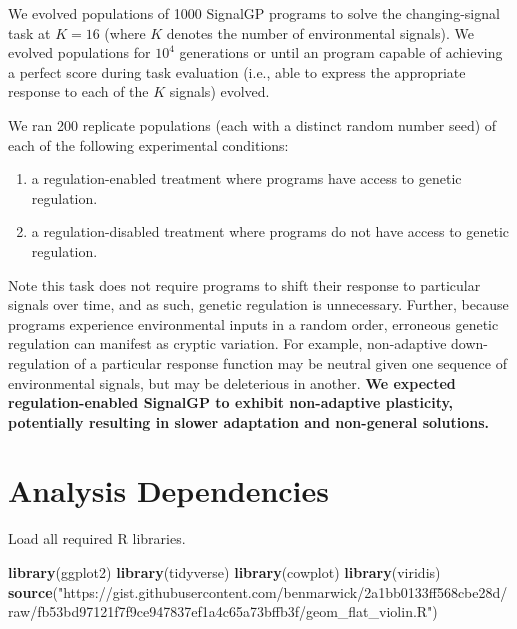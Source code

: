 \documentclass[
]{book}
\newenvironment{Shaded}{\begin{snugshade}}{\end{snugshade}}
\newcommand{\KeywordTok}[1]{\textcolor[rgb]{0.13,0.29,0.53}{\textbf{#1}}}
\newcommand{\NormalTok}[1]{#1}
\newcommand{\StringTok}[1]{\textcolor[rgb]{0.31,0.60,0.02}{#1}}
\providecommand{\tightlist}{%
  \setlength{\itemsep}{0pt}\setlength{\parskip}{0pt}}
\begin{document}
We evolved populations of 1000 SignalGP programs to solve the changing-signal task at \(K=16\) (where \(K\) denotes the number of environmental signals).
We evolved populations for \ensuremath{10^{4}} generations or until an program capable of achieving a perfect score during task evaluation (i.e., able to express the appropriate response to each of the \(K\) signals) evolved.

We ran 200 replicate populations (each with a distinct random number seed) of each of the following experimental conditions:

\begin{enumerate}
\def\labelenumi{\arabic{enumi}.}
\tightlist
\item
  a regulation-enabled treatment where programs have access to genetic regulation.
\item
  a regulation-disabled treatment where programs do not have access to genetic regulation.
\end{enumerate}

Note this task does not require programs to shift their response to particular signals over time, and as such, genetic regulation is unnecessary.
Further, because programs experience environmental inputs in a random order, erroneous genetic regulation can manifest as cryptic variation.
For example, non-adaptive down-regulation of a particular response function may be neutral given one sequence of environmental signals, but may be deleterious in another.
\textbf{We expected regulation-enabled SignalGP to exhibit non-adaptive plasticity, potentially resulting in slower adaptation and non-general solutions.}

\hypertarget{analysis-dependencies-4}{%
\section{Analysis Dependencies}\label{analysis-dependencies-4}}

Load all required R libraries.

\begin{Shaded}
\begin{Highlighting}[]
\KeywordTok{library}\NormalTok{(ggplot2)}
\KeywordTok{library}\NormalTok{(tidyverse)}
\KeywordTok{library}\NormalTok{(cowplot)}
\KeywordTok{library}\NormalTok{(viridis)}
\KeywordTok{source}\NormalTok{(}\StringTok{"https://gist.githubusercontent.com/benmarwick/2a1bb0133ff568cbe28d/raw/fb53bd97121f7f9ce947837ef1a4c65a73bffb3f/geom\_flat\_violin.R"}\NormalTok{)}
\end{Highlighting}
\end{Shaded}
\end{document}
